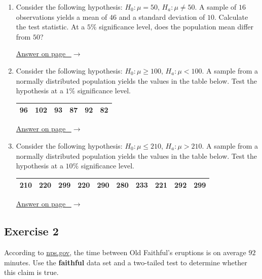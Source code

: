 \documentclass[
  11pt,
  letterpaper,
  DIV=11,
  numbers=noendperiod,
  oneside,
  open=any]{scrreprt}
\newcommand{\bsanswerref}[1]{%
  \par\nopagebreak\hypertarget{q-#1}{}\label{q-#1}%
  {\raggedleft\sffamily\footnotesize\hyperlink{a-#1}{\textcolor{bsaccent}{Answer on page \pageref{a-#1}\ $\rightarrow$}}\par}%
  \medskip}
\begin{document}
\begin{enumerate}
\def\labelenumi{\arabic{enumi}.}
\item
  Consider the following hypothesis: \(H_{0}: \mu = 50\),
  \(H_{a}: \mu \neq 50\). A sample of \(16\) observations yields a mean
  of \(46\) and a standard deviation of \(10\). Calculate the test
  statistic. At a \(5\%\) significance level, does the population mean
  differ from \(50\)?

  \bsanswerref{bsans122}
\item
  Consider the following hypothesis: \(H_{0}: \mu \geq 100\),
  \(H_{a}: \mu < 100\). A sample from a normally distributed population
  yields the values in the table below. Test the hypothesis at a \(1\%\)
  significance level.

  \begin{center}
  \begin{tabular}{cccccc}
  \toprule
  96 & 102 & 93 & 87 & 92 & 82 \\
  \bottomrule
  \end{tabular}
  \end{center}

  \bsanswerref{bsans123}
\item
  Consider the following hypothesis: \(H_{0}: \mu \leq 210\),
  \(H_{a}: \mu > 210\). A sample from a normally distributed population
  yields the values in the table below. Test the hypothesis at a
  \(10\%\) significance level.

  \begin{center}
  \begin{tabular}{cccccccccc}
  \toprule
  210 & 220 & 299 & 220 & 290 & 280 & 233 & 221 & 292 & 299 \\
  \bottomrule
  \end{tabular}
  \end{center}

  \bsanswerref{bsans124}
\end{enumerate}

\subsection*{Exercise 2}\label{exercise-2-12}

According to \href{https://www.nps.gov}{nps.gov}, the time between Old
Faithful's eruptions is on average \(92\) minutes. Use the
\textbf{faithful} data set and a two-tailed test to determine whether
this claim is true.
\end{document}
